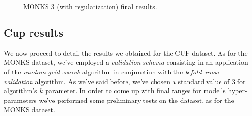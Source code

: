 \documentclass[11pt,twoside]{article}
\begin{document}
    \begin{figure}[htbp]
        \centering
        \begin{subfigure}{0.90\textwidth}
            \caption{}
            \label{fig:monks_3_MSE_reg}
        \end{subfigure}
        \begin{subfigure}{0.90\textwidth}
            \caption{}
            \label{fig:monks_3_ACC_reg}
        \end{subfigure}
        \caption{MONKS 3 (with regularization) final results.}
        \label{fig:monks_3_final_results}
    \end{figure}


    \subsection{Cup results} %
    \label{sub:cup_results}
        We now proceed to detail the results we obtained for the CUP dataset. As for the MONKS dataset, we've
        employed a \textit{validation schema} consisting in an application of the \textit{random grid search}
        algorithm in conjunction with the \textit{k-fold cross validation} algorithm. As we've said before,
        we've chosen a standard value of $3$ for algorithm's $k$ parameter. In order to come up with final
        ranges for model's hyper-parameters we've performed some preliminary tests on the dataset, as for the
        MONKS dataset.
\end{document}

